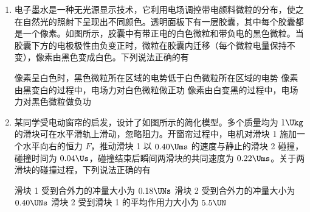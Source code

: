 \documentclass[\gkver]{gaokaozhenti}
\begin{document}
\begin{enumerate}
{据牛顿第三定律可知，货物对轨道的压力大小为 $380 \UN$，D 正确。

故选 BCD。
}

\item
电子墨水是一种无光源显示技术，它利用电场调控带电颜料微粒的分布，使之在自然光的照射下呈现出不同颜色。透明面板下有一层胶囊，其中每个胶囊都是一个像素。如图所示，胶囊中有带正电的白色微粒和带负电的黑色微粒。当胶囊下方的电极极性由负变正时，微粒在胶囊内迁移（每个微粒电量保持不变），像素由黑色变成白色。下列说法正确的有


{像素呈白色时，黑色微粒所在区域的电势低于白色微粒所在区域的电势}
{像素由黑变白的过程中，电场力对白色微粒做正功}
{像素由白变黑的过程中，电场力对黑色微粒做负功}


\item
某同学受电动窗帘的启发，设计了如图所示的简化模型。多个质量均为 $1 \Ukg$ 的滑块可在水平滑轨上滑动，忽略阻力。开窗帘过程中，电机对滑块 1 施加一个水平向右的恒力 $F$，推动滑块 1 以 $0.40 \Ums$ 的速度与静止的滑块 2 碰撞，碰撞时间为 $0.04 \Us$，碰撞结束后瞬间两滑块的共同速度为 $0.22 \Ums$。关于两滑块的碰撞过程，下列说法正确的有


{滑块 1 受到合外力的冲量大小为 $0.18 \UNs$}
{滑块 2 受到合外力的冲量大小为 $0.40 \UNs$}
{滑块 2 受到滑块 1 的平均作用力大小为 $5.5 \UN$}


\end{enumerate}
\end{document}
